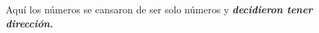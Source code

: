 \begin{capitulobox}
Aquí los números se cansaron de ser solo números y \textbf{\textit{decidieron tener dirección.}}
\end{capitulobox}
